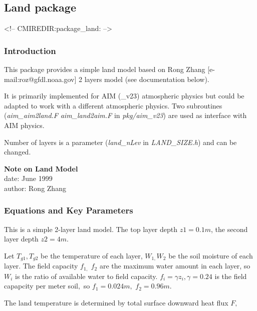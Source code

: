 \subsection{Land package}
\label{sec:pkg:land}
\begin{rawhtml}
<!-- CMIREDIR:package_land: -->
\end{rawhtml}

\subsubsection{Introduction}
This package provides a simple land model
based on Rong Zhang [e-mail:roz@gfdl.noaa.gov] 2 layers model
(see documentation below).

It is primarily implemented for AIM (\_v23) atmospheric physics
but could be adapted to work with a different atmospheric physics.
Two subroutines ({\it aim\_aim2land.F} {\it aim\_land2aim.F}
in {\it pkg/aim\_v23}) are used as interface with AIM physics. 

Number of layers is a parameter ({\it land\_nLev} in {\it LAND\_SIZE.h})
and can be changed. 



% 

\begin{center}
{\bf Note on Land Model}\\
date: June 1999\\
author: Rong Zhang\\
\end{center}


\subsubsection{Equations and Key Parameters}
This is a simple 2-layer land model. The top layer depth $z1=0.1m$, the
second layer depth $z2=4m$.

Let $T_{g1},T_{g2}$ be the temperature of each layer, $W_{1,}W_{2}$ be the
soil moisture of each layer. The field capacity $f_{1,}$ $f_{2}$ are the
maximum water amount in each layer, so $W_{i}$ is the ratio of available
water to field capacity. $f_{i}=\gamma z_{i},\gamma =0.24$ is the field
capapcity per meter soil$,$ so $f_{1}=0.024m,$ $f_{2}=0.96m.$

The land temperature is determined by total surface downward heat flux $F,$


